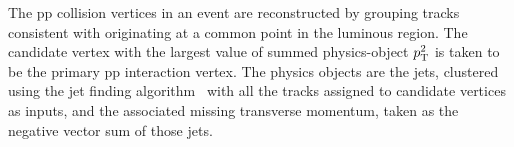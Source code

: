 The pp collision vertices in an event are reconstructed by grouping tracks consistent with originating at a common point in the luminous region.
The candidate vertex with the largest value of summed physics-object $p_{\mathrm{T}}^2$ is taken to be the primary pp interaction vertex.
The physics objects are the jets, clustered using the \antikt jet finding algorithm~\cite{Cacciari:2008gp, Cacciari:2011ma} with all the tracks assigned to candidate vertices as inputs,
and the associated missing transverse momentum, taken as the negative vector \pt sum of those jets.
